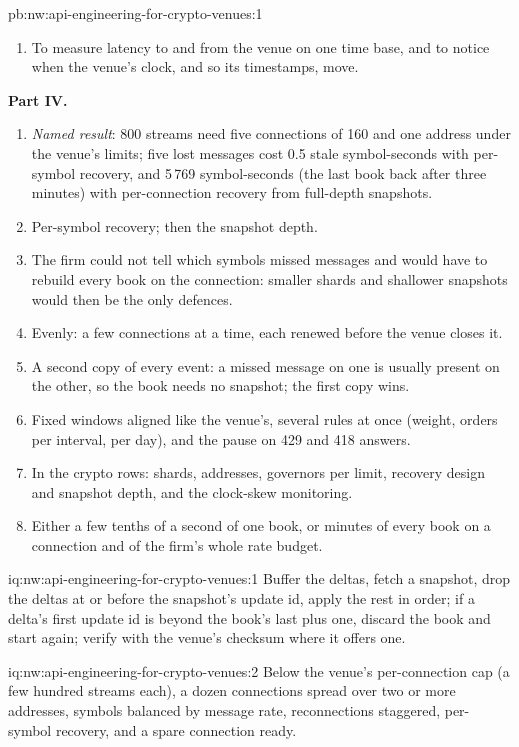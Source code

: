 \begin{solution}{pb:nw:api-engineering-for-crypto-venues:1}
\begin{enumerate}[resume]
\item To measure latency to and from the venue on one time base, and to notice when the venue's clock, and so its timestamps, move.
\end{enumerate}
\textbf{Part IV.}
\begin{enumerate}[resume]
\item \emph{Named result}: 800 streams need five connections of 160 and one address under the venue's limits; five lost messages cost 0.5 stale
  symbol-seconds with per-symbol recovery, and 5\,769 symbol-seconds (the last book back after three minutes) with per-connection recovery from full-depth
  snapshots.
\item Per-symbol recovery; then the snapshot depth.
\item The firm could not tell which symbols missed messages and would have to rebuild every book on the connection: smaller shards and shallower snapshots
  would then be the only defences.
\item Evenly: a few connections at a time, each renewed before the venue closes it.
\item A second copy of every event: a missed message on one is usually present on the other, so the book needs no snapshot; the first copy wins.
\item Fixed windows aligned like the venue's, several rules at once (weight, orders per interval, per day), and the pause on 429 and 418 answers.
\item In the crypto rows: shards, addresses, governors per limit, recovery design and snapshot depth, and the clock-skew monitoring.
\item Either a few tenths of a second of one book, or minutes of every book on a connection and of the firm's whole rate budget.
\end{enumerate}
\end{solution}

\begin{solution}{iq:nw:api-engineering-for-crypto-venues:1}
Buffer the deltas, fetch a snapshot, drop the deltas at or before the snapshot's update id, apply the rest in order; if a delta's first update id is beyond
the book's last plus one, discard the book and start again; verify with the venue's checksum where it offers one.
\end{solution}

\begin{solution}{iq:nw:api-engineering-for-crypto-venues:2}
Below the venue's per-connection cap (a few hundred streams each), a dozen connections spread over two or more addresses, symbols balanced by message
rate, reconnections staggered, per-symbol recovery, and a spare connection ready.
\end{solution}

